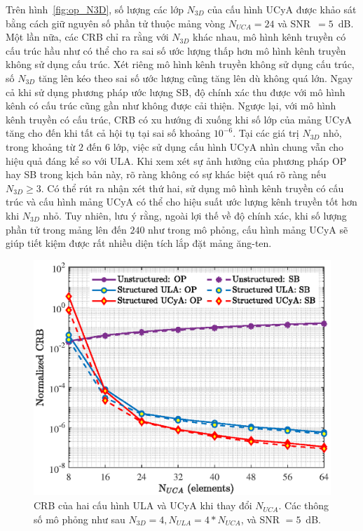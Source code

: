 Trên hình~\ref{fig:op_N3D}, số lượng các lớp $N_{3D}$ của cấu hình UCyA được khảo sát bằng cách giữ nguyên số phần tử thuộc mảng vòng $N_{UCA} = 24$ và SNR~$=5$~dB. Một lần nữa, các CRB chỉ ra rằng với $N_{3D}$ khác nhau, mô hình kênh truyền có cấu trúc hầu như có thể cho ra sai số ước lượng thấp hơn mô hình kênh truyền không sử dụng cấu trúc. Xét riêng mô hình kênh truyền không sử dụng cấu trúc, số $N_{3D}$ tăng lên kéo theo sai số ước lượng cũng tăng lên dù không quá lớn. Ngay cả khi sử dụng phương pháp ước lượng SB, độ chính xác thu được với mô hình kênh có cấu trúc cũng gần như không được cải thiện. Ngược lại, với mô hình kênh truyền có cấu trúc, CRB có xu hướng đi xuống khi số lớp của mảng UCyA tăng cho đến khi tất cả hội tụ tại sai số khoảng $10^{-6}$. Tại các giá trị $N_{3D}$ nhỏ, trong khoảng từ $2$ đến $6$ lớp, việc sử dụng cấu hình UCyA nhìn chung vẫn cho hiệu quả đáng kể so với ULA. Khi xem xét sự ảnh hưởng của phương pháp OP hay SB trong kịch bản này, rõ ràng không có sự khác biệt quá rõ ràng nếu $N_{3D} \ge 3$. Có thể rút ra nhận xét thứ hai, sử dụng mô hình kênh truyền có cấu trúc và cấu hình mảng UCyA có thể cho hiệu suất ước lượng kênh truyền tốt hơn khi $N_{3D}$ nhỏ. Tuy nhiên, lưu ý rằng, ngoài lợi thế về độ chính xác, khi số lượng phần tử trong mảng lên đến $240$ như trong mô phỏng, cấu hình mảng UCyA sẽ giúp tiết kiệm được rất nhiều diện tích lắp đặt mảng ăng-ten.
\begin{figure}[ht]
    \centering
    \includegraphics[width=\linewidth]{figures/fig_3_3.eps}
    \caption{CRB của hai cấu hình ULA và UCyA khi thay đổi $N_{UCA}$. Các thông số mô phỏng như sau $N_{3D} = 4, N_{ULA} = 4 * N_{UCA}$, và SNR $=5$~dB.}
    \label{fig:op_NUCA}
\end{figure}

